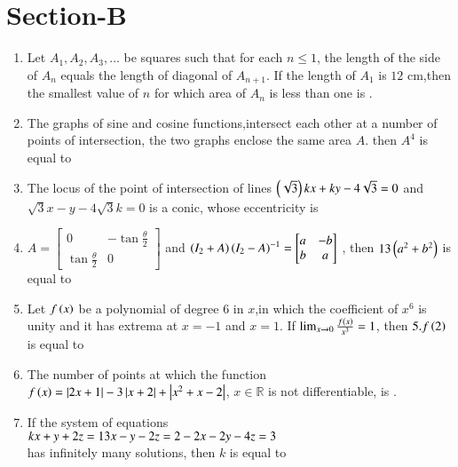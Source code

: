 \documentclass[journal,12pt,onecolumn]{IEEEtran}
\theoremstyle{remark}
\begin{document}
\section{Section-B}
\begin{enumerate}
	\item Let $A_1,A_2,A_3,\dots$ be squares such that for each $n\leq1$, the length of the side of $A_n$ equals the length of diagonal of $A_{n+1}$. If the length of $A_1$ is $12$ cm,then the smallest value of $n$ for which area of $A_n$ is less than one is .\\

	\item The graphs of sine and cosine functions,intersect each other at a number of points of intersection, the two graphs enclose the same area $A$. then $A^4$ is equal to \\

	\item The locus of the point of intersection of lines $\left(\sqrt{3}\right)kx+ky-4\sqrt{3}= 0$ and $\sqrt{3}x-y-4\sqrt{3}k=0$ is a conic, whose eccentricity is \\

	\item $A=\begin{bmatrix}
			0 & -\tan{\frac{\theta}{2}}\\
			\tan{\frac{\theta}{2}} & 0
	\end{bmatrix}$ and $\left(I_2+A\right){\left(I_2-A\right)}^{-1}= \begin{bmatrix}
		a & -b\\
		b & a
	\end{bmatrix}$
		, then $13\left(a^2+b^2\right)$ is equal to \\
		
	\item Let $f\left(x\right)$ be a polynomial of degree $6$ in $x$,in which the coefficient of $x^6$ is unity and it has extrema at $x=-1$ and $x=1$. If $\lim_{x\to 0} \frac{f\left(x\right)}{x^3}=1$, then $5.f\left(2\right)$ is equal to \\

	\item The number of points at which the function $f\left(x\right)=\left\vert2x+1\right\vert-3\left\vert x+2\right\vert+\left\vert x^2+x-2\right\vert$, $x\in\mathbb{R}$ is not differentiable, is .
		
	\item If the system of equations \\
		$kx+y+2z=1\\
		3x-y-2z=2\\
		-2x-2y-4z=3$\\
		has infinitely many solutions, then $k$ is equal to \\


\end{enumerate}
\end{document}
